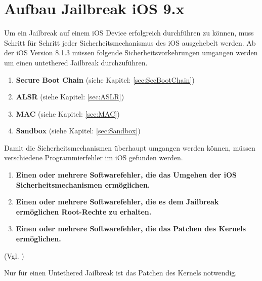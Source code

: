 \section{Aufbau Jailbreak iOS 9.x}
\label{sec:JBAufbau}
Um ein Jailbreak auf einem iOS Device erfolgreich durchführen zu können, muss Schritt für Schritt jeder Sicherheitsmechanismus des iOS ausgehebelt werden. Ab der iOS Version 8.1.3 müssen folgende Sicherheitsvorkehrungen umgangen werden um einen untethered Jailbreak durchzuführen.

\begin{enumerate}
	    \item \textbf{Secure Boot Chain} (siehe Kapitel: \ref{sec:SecBootChain})
	    \item \textbf{ALSR }(siehe Kapitel: \ref{sec:ASLR})
	    \item \textbf{MAC} (siehe Kapitel: \ref{sec:MAC})
	   \item \textbf{Sandbox} (siehe Kapitel: \ref{sec:Sandbox}) 
\end{enumerate}

Damit die Sicherheitsmechanismen überhaupt umgangen werden können, müssen verschiedene Programmierfehler im iOS gefunden werden. 
\begin{enumerate}
  \item \textbf{Einen oder mehrere Softwarefehler, die das Umgehen der iOS Sicherheitsmechanismen ermöglichen.}
  \item \textbf{Einen oder mehrere Softwarefehler, die es dem Jailbreak ermöglichen Root-Rechte zu erhalten.}
  \item \textbf{Einen oder mehrere Softwarefehler, die das Patchen des Kernels ermöglichen.}
\end{enumerate}
(Vgl. \cite{TaiG[1], TaiG[2], TaiG[3]})

Nur für einen Untethered Jailbreak ist das Patchen des Kernels notwendig.



